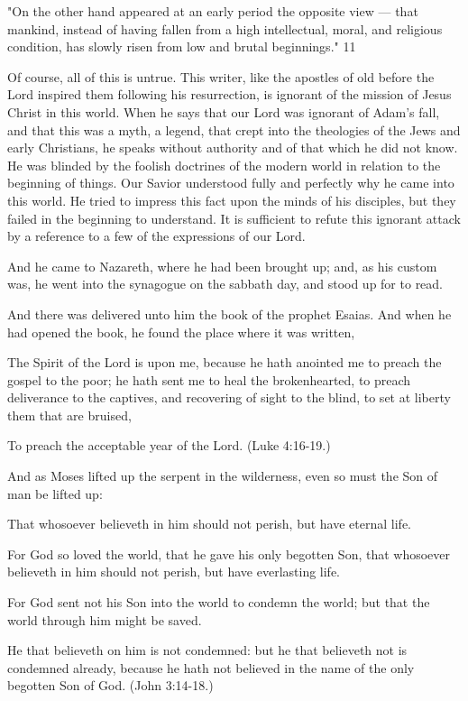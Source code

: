 "On the other hand appeared at an early period the opposite view — that mankind, instead of
having fallen from a high intellectual, moral, and religious condition, has slowly risen from
low and brutal beginnings." 11

Of course, all of this is untrue. This writer, like the apostles of old before the Lord inspired
them following his resurrection, is ignorant of the mission of Jesus Christ in this world.
When he says that our Lord was ignorant of Adam's fall, and that this was a myth, a legend,
that crept into the theologies of the Jews and early Christians, he speaks without authority
and of that which he did not know. He was blinded by the foolish doctrines of the modern
world in relation to the beginning of things. Our Savior understood fully and perfectly why
he came into this world. He tried to impress this fact upon the minds of his disciples, but they
failed in the beginning to understand. It is sufficient to refute this ignorant attack by a
reference to a few of the expressions of our Lord.

And he came to Nazareth, where he had been brought up; and, as his custom was, he went
into the synagogue on the sabbath day, and stood up for to read.

And there was delivered unto him the book of the prophet Esaias. And when he had opened
the book, he found the place where it was written,

The Spirit of the Lord is upon me, because he hath anointed me to preach the gospel to the
poor; he hath sent me to heal the brokenhearted, to preach deliverance to the captives, and
recovering of sight to the blind, to set at liberty them that are bruised,

To preach the acceptable year of the Lord. (Luke 4:16-19.)

And as Moses lifted up the serpent in the wilderness, even so must the Son of man be lifted
up:

That whosoever believeth in him should not perish, but have eternal life.

For God so loved the world, that he gave his only begotten Son, that whosoever believeth in
him should not perish, but have everlasting life.

For God sent not his Son into the world to condemn the world; but that the world through
him might be saved.

He that believeth on him is not condemned: but he that believeth not is condemned already,
because he hath not believed in the name of the only begotten Son of God. (John 3:14-18.)

